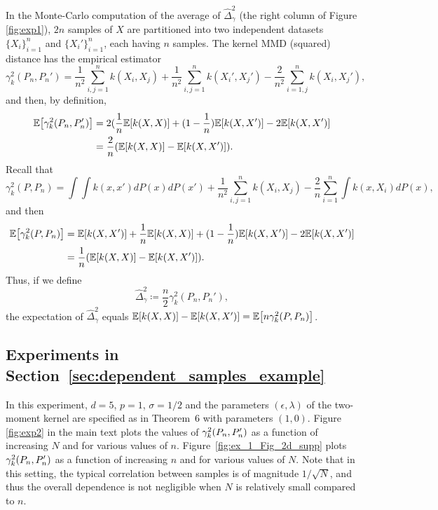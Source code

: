 \documentclass{article}
\theoremstyle{definition}
\newcommand{\ex}[1]{\ensuremath{\mathbb{E}\left[ #1\right]}}
\newcommand{\eps}{\epsilon}
\let\originalleft\left
\let\originalright\right
\renewcommand{\left}{\mathopen{}\mathclose\bgroup\originalleft}
\renewcommand{\right}{\aftergroup\egroup\originalright}
\begin{document}
In the Monte-Carlo computation of the average of  $ \hat{\Delta}_\gamma^2$ (the right column of Figure \ref{fig:exp1}), 
$2n$ samples of $X$ are partitioned into two independent datasets $\{ X_i\}_{i=1}^n$ and $\{ X_i'\}_{i=1}^n$, each having $n$ samples. The kernel MMD (squared) distance has the empirical estimator \cite{gretton2012kernel}
\[
  \gamma^2_k(P_n,P_n') =  \frac{1}{n^2} \sum_{i,j=1}^n  k(X_i, X_j) +   \frac{1}{n^2} \sum_{i,j=1}^n k(X_i',X_j') 
  - \frac{2}{n^2} \sum_{i=1,j}^n  k(X_i, X_j'), 
\]
and then, by definition,
\begin{align*}
\ex{  \gamma^2_k(P_n,P_n') }
& =   2  ( \frac{1}{n}  \ex{k(X,X)} + (1- \frac{1}{n})   \ex{k(X,X')}
  - 2  \ex{k(X,X')}  \\
& =   \frac{2}{n } (  \ex{k(X,X)} -  \ex{k(X,X')} ).
\end{align*}
Recall that 
\[
  \gamma^2_k(P,P_n) = \int \int  k(x,x') dP(x) dP(x') +   \frac{1}{n^2} \sum_{i,j=1}^n k(X_i, X_j) 
  - \frac{2}{n} \sum_{i=1}^n  \int  k(x, X_i) dP(x),
\]
and then
\begin{align*}
 \ex{ \gamma^2_k(P,P_n)}
 & =  \ex{k(X,X')}
 +     \frac{1}{n} \ex{k(X,X)} + (1-\frac{1}{n}) \ex{k(X,X')}  
  -  2 \ex{  k( X, X')} \\
 & =  
    \frac{1}{n} (  \ex{k(X,X)} -  \ex{k(X,X')} ).
\end{align*}
Thus, if we define
\[
\hat{\Delta}_\gamma^2 \coloneqq \frac{n}{2} \gamma_k^2( P_n, P_n'),
\]
the expectation of $\hat{\Delta}_\gamma^2$ equals $ \ex{k(X,X)} -  \ex{k(X,X')} = \ex{ n \gamma^2_k(P,P_n)}$.



\subsection{Experiments in Section~\ref{sec:dependent_samples_example}}
In this experiment,  $d =5$, $p=1$,  $\sigma = 1/2$ and the parameters $(\eps, \lambda)$ of the two-moment kernel are specified as in Theorem~6 with parameters $(1,0)$. 
Figure \ref{fig:exp2} in the main text plots the values of  $\gamma_{k}^{2}\left( P_n,  P^{\prime}_{n}\right)$ as a function of increasing $N$ and for various  values of $n$. 
Figure~\ref{fig:ex_1_Fig_2d_supp} plots $\gamma_{k}^{2}\left( P_n,  P^{\prime}_{n}\right)$
as a function of increasing $n$ and for various values of $N$. 
Note that in this setting, 
the typical correlation between  samples is of magnitude $1/\sqrt{N}$, 
and thus the overall dependence is not negligible when $N$ is relatively small compared to $n$. 
\end{document}

